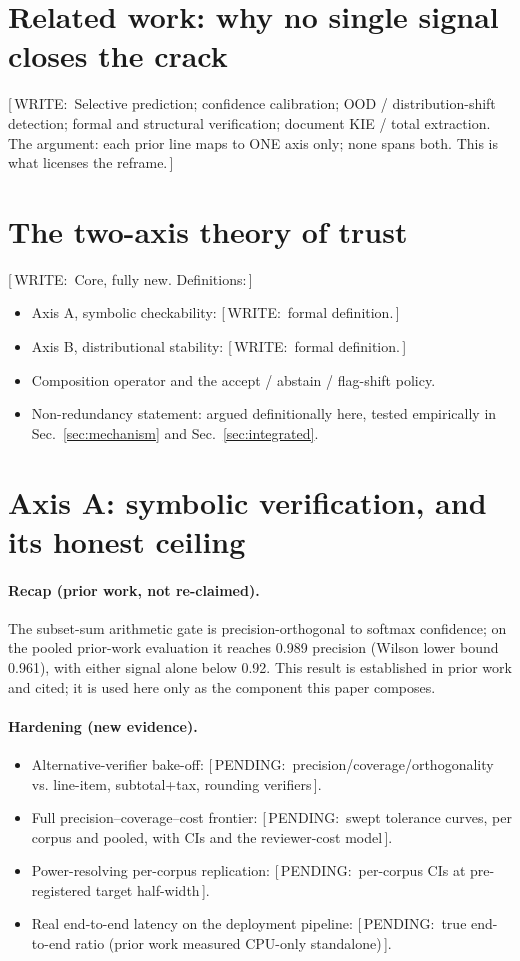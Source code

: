 \documentclass[10pt,twocolumn,a4paper]{article}
\newcommand{\priorfact}[1]{#1}
\newcommand{\pending}[1]{{\small\sffamily\color{pendingclr}[\,PENDING:\ #1\,]}}
\newcommand{\todo}[1]{{\small\sffamily\color{writeclr}[\,WRITE:\ #1\,]}}
\begin{document}
\section{Related work: why no single signal closes the crack}
\label{sec:related}
\todo{Selective prediction; confidence calibration; OOD / distribution-shift
detection; formal and structural verification; document KIE / total
extraction. The argument: each prior line maps to ONE axis only; none spans
both. This is what licenses the reframe.}

\section{The two-axis theory of trust}
\label{sec:theory}
\todo{Core, fully new. Definitions:}
\begin{itemize}
  \item Axis A, symbolic checkability: \todo{formal definition.}
  \item Axis B, distributional stability: \todo{formal definition.}
  \item Composition operator and the accept / abstain / flag-shift policy.
  \item Non-redundancy statement: argued definitionally here, tested
  empirically in Sec.~\ref{sec:mechanism} and Sec.~\ref{sec:integrated}.
\end{itemize}

\section{Axis A: symbolic verification, and its honest ceiling}
\label{sec:axisA}
\paragraph{Recap (prior work, not re-claimed).}
\priorfact{The subset-sum arithmetic gate is precision-orthogonal to softmax
confidence; on the pooled prior-work evaluation it reaches 0.989 precision
(Wilson lower bound 0.961), with either signal alone below 0.92.}
This result is established in prior work and cited; it is used here only as
the component this paper composes.
\paragraph{Hardening (new evidence).}
\begin{itemize}
  \item Alternative-verifier bake-off: \pending{precision/coverage/orthogonality vs. line-item, subtotal+tax, rounding verifiers}.
  \item Full precision--coverage--cost frontier: \pending{swept tolerance curves, per corpus and pooled, with CIs and the reviewer-cost model}.
  \item Power-resolving per-corpus replication: \pending{per-corpus CIs at pre-registered target half-width}.
  \item Real end-to-end latency on the deployment pipeline: \pending{true end-to-end ratio (prior work measured CPU-only standalone)}.
\end{itemize}
\end{document}
